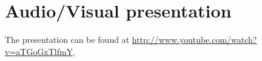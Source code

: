 \section{Audio/Visual presentation}
The presentation can be found at \url{http://www.youtube.com/watch?v=aTGoGxTlfmY}.
